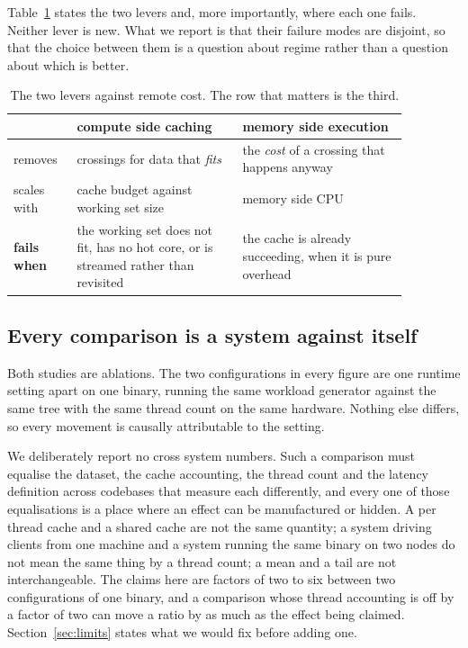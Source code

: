 \documentclass[sigconf,nonacm]{acmart}
\begin{document}
Table~\ref{tab:levers} states the two levers and, more importantly, where each
one fails. Neither lever is new. What we report is that their failure modes are
disjoint, so that the choice between them is a question about regime rather than
a question about which is better.

\begin{table}[t]
\centering
\small
\caption{The two levers against remote cost. The row that matters is the third.}
\label{tab:levers}
\begin{tabular}{@{}p{0.13\linewidth}p{0.37\linewidth}p{0.37\linewidth}@{}}
\toprule
 & compute side caching & memory side execution \\
\midrule
removes & crossings for data that \emph{fits} & the \emph{cost} of a crossing
  that happens anyway \\
\addlinespace
scales with & cache budget against working set size & memory side CPU \\
\addlinespace
\textbf{fails when} & the working set does not fit, has no hot core, or is
  streamed rather than revisited & the cache is already succeeding, when it is
  pure overhead \\
\bottomrule
\end{tabular}
\end{table}

\subsection{Every comparison is a system against itself}

Both studies are ablations. The two configurations in every figure are one
runtime setting apart on one binary, running the same workload generator against
the same tree with the same thread count on the same hardware. Nothing else
differs, so every movement is causally attributable to the setting.

We deliberately report no cross system numbers. Such a comparison must equalise
the dataset, the cache accounting, the thread count and the latency definition
across codebases that measure each differently, and every one of those
equalisations is a place where an effect can be manufactured or hidden. A per
thread cache and a shared cache are not the same quantity; a system driving
clients from one machine and a system running the same binary on two nodes do not
mean the same thing by a thread count; a mean and a tail are not interchangeable.
The claims here are factors of two to six between two configurations of one
binary, and a comparison whose thread accounting is off by a factor of two can
move a ratio by as much as the effect being claimed. Section~\ref{sec:limits}
states what we would fix before adding one.
\end{document}
